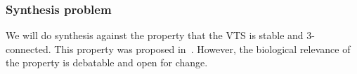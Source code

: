 \subsubsection{Synthesis problem}

We will do synthesis against the property that the VTS
is stable and 3-connected.
%
%
This property was proposed in~\cite{shukla2017discovering}.
%
However, the biological relevance of the property is debatable and open for change.
%


             
